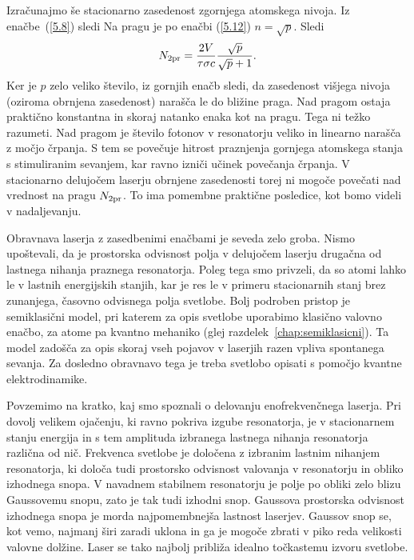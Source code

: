 Izračunajmo še stacionarno zasedenost zgornjega atomskega nivoja. Iz 
enačbe~(\ref{5.8}) sledi
Na pragu je po enačbi (\ref{5.12}) $n=\sqrt{p}$. 
Sledi 
\begin{equation}  
N_{\rm 2pr}=\frac{2V}{\tau \sigma c}\frac{\sqrt{p}}{\sqrt{p}+1}.
\label{5.16}
\end{equation}
Ker je $p$ zelo veliko število, iz gornjih enačb sledi, da zasedenost višjega
nivoja (oziroma obrnjena zasedenost) narašča le do bližine praga. Nad pragom ostaja praktično
konstantna in skoraj natanko enaka kot na pragu. Tega ni težko razumeti. Nad
pragom je število fotonov v resonatorju veliko in linearno narašča 
z močjo črpanja. S tem se povečuje hitrost praznjenja gornjega atomskega 
stanja s stimuliranim sevanjem, kar ravno izniči učinek povečanja črpanja. 
V stacionarno delujočem laserju obrnjene zasedenosti torej ni mogoče povečati 
nad vrednost na pragu $N_{\rm 2pr}$. To ima pomembne praktične posledice, kot bomo
videli v nadaljevanju.

\begin{remark}
Obravnava laserja z zasedbenimi enačbami je seveda zelo groba. Nismo
upoštevali, da je prostorska odvisnost polja v delujočem laserju 
drugačna od lastnega nihanja praznega resonatorja. Poleg tega smo
privzeli, da so atomi lahko le v lastnih energijskih stanjih, kar je res le
v primeru stacionarnih stanj brez zunanjega, časovno odvisnega polja
svetlobe. Bolj podroben pristop je semiklasični model, pri katerem 
za opis svetlobe uporabimo klasično valovno enačbo, za atome
pa kvantno mehaniko (glej razdelek~\ref{chap:semiklasicni}). Ta model
zadošča za opis skoraj vseh pojavov v laserjih razen vpliva spontanega sevanja. 
Za dosledno obravnavo tega je treba svetlobo opisati s pomočjo 
kvantne elektrodinamike.
\end{remark}

Povzemimo na kratko, kaj smo spoznali o delovanju 
enofrekvenčnega laserja. Pri dovolj velikem ojačenju, ki ravno pokriva izgube 
resonatorja, je v stacionarnem stanju energija in s tem amplituda 
izbranega lastnega nihanja resonatorja različna od nič. Frekvenca svetlobe je
določena z izbranim lastnim nihanjem resonatorja, ki določa tudi prostorsko
odvisnost valovanja v resonatorju in obliko izhodnega snopa. V navadnem stabilnem 
resonatorju je polje po obliki zelo blizu Gaussovemu snopu, zato je tak tudi izhodni snop.
Gaussova prostorska odvisnost izhodnega snopa je morda najpomembnejša lastnost
laserjev. Gaussov snop se, kot vemo, najmanj širi zaradi uklona in ga je mogoče
zbrati v piko reda velikosti valovne dolžine. Laser se tako najbolj 
približa idealno točkastemu izvoru svetlobe.

